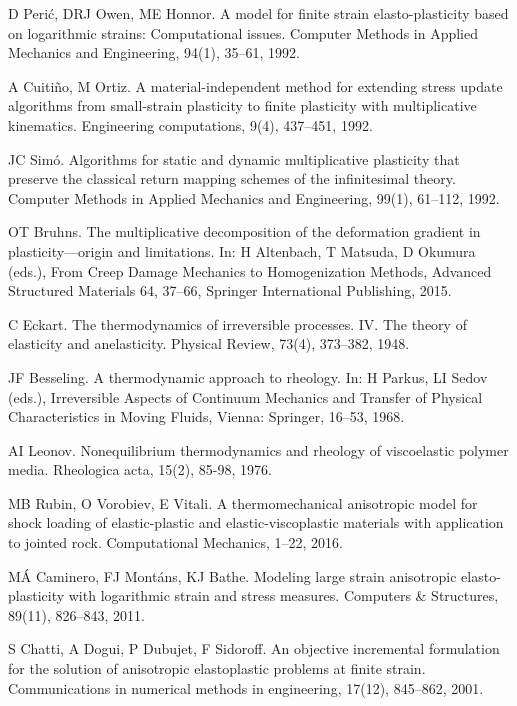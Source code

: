 \documentclass[preprint,review,12pt,sort&compress]{elsarticle}%
\begin{document}
\begin{thebibliography}{99}
D Peri\'{c}, DRJ Owen, ME Honnor. A model for
finite strain elasto-plasticity based on logarithmic strains: Computational
issues. Computer Methods in Applied Mechanics and Engineering, 94(1), 35--61, 1992.

A Cuiti\~{n}o, M Ortiz. A material-independent method
for extending stress update algorithms from small-strain plasticity to finite
plasticity with multiplicative kinematics. Engineering computations, 9(4),
437--451, 1992.

JC Sim\'{o}. Algorithms for static and dynamic multiplicative
plasticity that preserve the classical return mapping schemes of the
infinitesimal theory. Computer Methods in Applied Mechanics and Engineering,
99(1), 61--112, 1992.

OT Bruhns. The multiplicative decomposition of the
deformation gradient in plasticity---origin and limitations. In: H Altenbach,
T Matsuda, D Okumura (eds.), From Creep Damage Mechanics to Homogenization
Methods, Advanced Structured Materials 64, 37--66, Springer International
Publishing, 2015.

C Eckart. The thermodynamics of irreversible processes. IV.
The theory of elasticity and anelasticity. Physical Review, 73(4), 373--382, 1948.

JF Besseling. A thermodynamic approach to rheology. In:
H Parkus, LI Sedov (eds.), Irreversible Aspects of Continuum Mechanics and
Transfer of Physical Characteristics in Moving Fluids, Vienna: Springer,
16--53, 1968.

AI Leonov. Nonequilibrium thermodynamics and rheology of
viscoelastic polymer media. Rheologica acta, 15(2), 85-98, 1976.

MB Rubin, O Vorobiev, E Vitali. A thermomechanical
anisotropic model for shock loading of elastic-plastic and
elastic-viscoplastic materials with application to jointed rock. Computational
Mechanics, 1--22, 2016.

M\'{A} Caminero, FJ Mont\'{a}ns, KJ Bathe.
Modeling large strain anisotropic elasto-plasticity with logarithmic strain
and stress measures. Computers \& Structures, 89(11), 826--843, 2011.

S Chatti, A Dogui, P Dubujet, F Sidoroff. An objective
incremental formulation for the solution of anisotropic elastoplastic problems
at finite strain. Communications in numerical methods in engineering, 17(12),
845--862, 2001.


\end{thebibliography}
\end{document}
